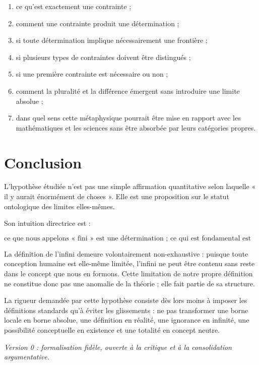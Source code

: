 \documentclass[11pt,a4paper]{article}
\begin{document}
\begin{enumerate}
    \item ce qu'est exactement une contrainte ;
    \item comment une contrainte produit une détermination ;
    \item si toute détermination implique nécessairement une frontière ;
    \item si plusieurs types de contraintes doivent être distingués ;
    \item si une première contrainte est nécessaire ou non ;
    \item comment la pluralité et la différence émergent sans introduire une limite absolue ;
    \item dans quel sens cette métaphysique pourrait être mise en rapport avec les mathématiques et les sciences sans être absorbée par leurs catégories propres.
\end{enumerate}

\section*{Conclusion}

L'hypothèse étudiée n'est pas une simple affirmation quantitative selon laquelle « il y aurait énormément de choses ». Elle est une proposition sur le statut ontologique des limites elles-mêmes.

Son intuition directrice est :

\[
\boxed{
\text{ce que nous appelons « fini » est une détermination ; ce qui est fondamental est le non-limitable.}
}
\]

La définition de l'infini demeure volontairement non-exhaustive : puisque toute conception humaine est elle-même limitée, l'infini ne peut être contenu sans reste dans le concept que nous en formons. Cette limitation de notre propre définition ne constitue donc pas une anomalie de la théorie ; elle fait partie de sa structure.

La rigueur demandée par cette hypothèse consiste dès lors moins à imposer les définitions standards qu'à éviter les glissements : ne pas transformer une borne locale en borne absolue, une définition en réalité, une ignorance en infinité, une possibilité conceptuelle en existence et une totalité en concept neutre.

\bigskip
\begin{center}
\textit{Version 0 : formalisation fidèle, ouverte à la critique et à la consolidation argumentative.}
\end{center}
\end{document}

